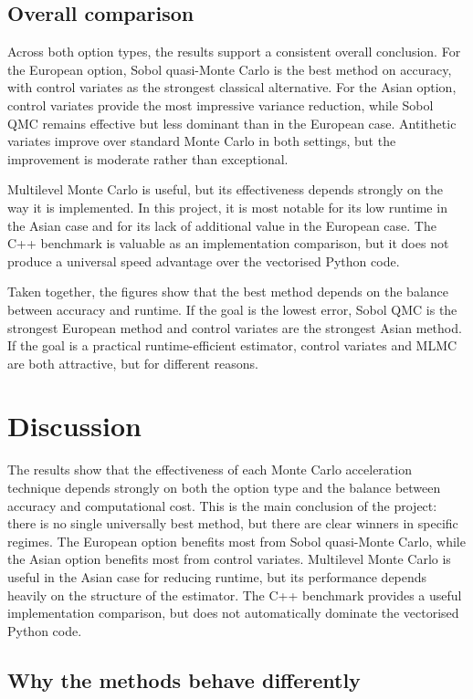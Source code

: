 \documentclass[11pt]{article}
\begin{document}
\subsection{Overall comparison}

Across both option types, the results support a consistent overall conclusion. For the European option, Sobol quasi-Monte Carlo is the best method on accuracy, with control variates as the strongest classical alternative. For the Asian option, control variates provide the most impressive variance reduction, while Sobol QMC remains effective but less dominant than in the European case. Antithetic variates improve over standard Monte Carlo in both settings, but the improvement is moderate rather than exceptional.

Multilevel Monte Carlo is useful, but its effectiveness depends strongly on the way it is implemented. In this project, it is most notable for its low runtime in the Asian case and for its lack of additional value in the European case. The C++ benchmark is valuable as an implementation comparison, but it does not produce a universal speed advantage over the vectorised Python code.

Taken together, the figures show that the best method depends on the balance between accuracy and runtime. If the goal is the lowest error, Sobol QMC is the strongest European method and control variates are the strongest Asian method. If the goal is a practical runtime-efficient estimator, control variates and MLMC are both attractive, but for different reasons.

\section{Discussion}

The results show that the effectiveness of each Monte Carlo acceleration technique depends strongly on both the option type and the balance between accuracy and computational cost. This is the main conclusion of the project: there is no single universally best method, but there are clear winners in specific regimes. The European option benefits most from Sobol quasi-Monte Carlo, while the Asian option benefits most from control variates. Multilevel Monte Carlo is useful in the Asian case for reducing runtime, but its performance depends heavily on the structure of the estimator. The C++ benchmark provides a useful implementation comparison, but does not automatically dominate the vectorised Python code.

\subsection{Why the methods behave differently}
\end{document}
